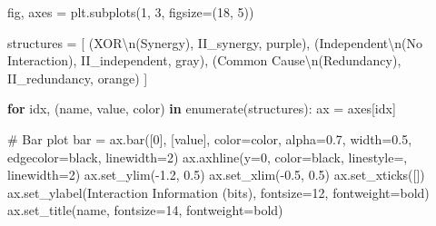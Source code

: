 \documentclass[
  11pt,
  letterpaper,
  oneside,
  openany]{book}
\newenvironment{Shaded}{\begin{snugshade}}{\end{snugshade}}
\newcommand{\BuiltInTok}[1]{\textcolor[rgb]{0.00,0.23,0.31}{#1}}
\newcommand{\CharTok}[1]{\textcolor[rgb]{0.13,0.47,0.30}{#1}}
\newcommand{\CommentTok}[1]{\textcolor[rgb]{0.37,0.37,0.37}{#1}}
\newcommand{\ControlFlowTok}[1]{\textcolor[rgb]{0.00,0.23,0.31}{\textbf{#1}}}
\newcommand{\DecValTok}[1]{\textcolor[rgb]{0.68,0.00,0.00}{#1}}
\newcommand{\FloatTok}[1]{\textcolor[rgb]{0.68,0.00,0.00}{#1}}
\newcommand{\KeywordTok}[1]{\textcolor[rgb]{0.00,0.23,0.31}{\textbf{#1}}}
\newcommand{\NormalTok}[1]{\textcolor[rgb]{0.00,0.23,0.31}{#1}}
\newcommand{\OperatorTok}[1]{\textcolor[rgb]{0.37,0.37,0.37}{#1}}
\newcommand{\StringTok}[1]{\textcolor[rgb]{0.13,0.47,0.30}{#1}}
\begin{document}
\begin{Shaded}
\begin{Highlighting}[]
\NormalTok{fig, axes }\OperatorTok{=}\NormalTok{ plt.subplots(}\DecValTok{1}\NormalTok{, }\DecValTok{3}\NormalTok{, figsize}\OperatorTok{=}\NormalTok{(}\DecValTok{18}\NormalTok{, }\DecValTok{5}\NormalTok{))}

\NormalTok{structures }\OperatorTok{=}\NormalTok{ [}
\NormalTok{    (}\StringTok{\textquotesingle{}XOR}\CharTok{\textbackslash{}n}\StringTok{(Synergy)\textquotesingle{}}\NormalTok{, II\_synergy, }\StringTok{\textquotesingle{}purple\textquotesingle{}}\NormalTok{),}
\NormalTok{    (}\StringTok{\textquotesingle{}Independent}\CharTok{\textbackslash{}n}\StringTok{(No Interaction)\textquotesingle{}}\NormalTok{, II\_independent, }\StringTok{\textquotesingle{}gray\textquotesingle{}}\NormalTok{),}
\NormalTok{    (}\StringTok{\textquotesingle{}Common Cause}\CharTok{\textbackslash{}n}\StringTok{(Redundancy)\textquotesingle{}}\NormalTok{, II\_redundancy, }\StringTok{\textquotesingle{}orange\textquotesingle{}}\NormalTok{)}
\NormalTok{]}

\ControlFlowTok{for}\NormalTok{ idx, (name, value, color) }\KeywordTok{in} \BuiltInTok{enumerate}\NormalTok{(structures):}
\NormalTok{    ax }\OperatorTok{=}\NormalTok{ axes[idx]}
    
    \CommentTok{\# Bar plot}
\NormalTok{    bar }\OperatorTok{=}\NormalTok{ ax.bar([}\DecValTok{0}\NormalTok{], [value], color}\OperatorTok{=}\NormalTok{color, alpha}\OperatorTok{=}\FloatTok{0.7}\NormalTok{, width}\OperatorTok{=}\FloatTok{0.5}\NormalTok{, edgecolor}\OperatorTok{=}\StringTok{\textquotesingle{}black\textquotesingle{}}\NormalTok{, linewidth}\OperatorTok{=}\DecValTok{2}\NormalTok{)}
\NormalTok{    ax.axhline(y}\OperatorTok{=}\DecValTok{0}\NormalTok{, color}\OperatorTok{=}\StringTok{\textquotesingle{}black\textquotesingle{}}\NormalTok{, linestyle}\OperatorTok{=}\StringTok{\textquotesingle{}{-}\textquotesingle{}}\NormalTok{, linewidth}\OperatorTok{=}\DecValTok{2}\NormalTok{)}
\NormalTok{    ax.set\_ylim(}\OperatorTok{{-}}\FloatTok{1.2}\NormalTok{, }\FloatTok{0.5}\NormalTok{)}
\NormalTok{    ax.set\_xlim(}\OperatorTok{{-}}\FloatTok{0.5}\NormalTok{, }\FloatTok{0.5}\NormalTok{)}
\NormalTok{    ax.set\_xticks([])}
\NormalTok{    ax.set\_ylabel(}\StringTok{\textquotesingle{}Interaction Information (bits)\textquotesingle{}}\NormalTok{, fontsize}\OperatorTok{=}\DecValTok{12}\NormalTok{, fontweight}\OperatorTok{=}\StringTok{\textquotesingle{}bold\textquotesingle{}}\NormalTok{)}
\NormalTok{    ax.set\_title(name, fontsize}\OperatorTok{=}\DecValTok{14}\NormalTok{, fontweight}\OperatorTok{=}\StringTok{\textquotesingle{}bold\textquotesingle{}}\NormalTok{)}
    

\end{Highlighting}
\end{Shaded}
\end{document}

